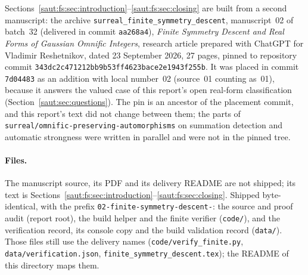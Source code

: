 \documentclass[11pt]{article}
\theoremstyle{definition}
\theoremstyle{remark}
\newcommand{\repo}[1]{\nolinkurl{#1}}%
\numberwithin{equation}{section}
\begin{document}
Sections~\ref{saut:fs:sec:introduction}--\ref{saut:fs:sec:closing} are built from a
second manuscript: the archive \texttt{surreal\_finite\_symmetry\_descent},
manuscript~02 of batch~32 (delivered in commit \texttt{aa268a4}), \emph{Finite
Symmetry Descent and Real Forms of Gaussian Omnific Integers}, research article
prepared with ChatGPT for Vladimir Reshetnikov, dated 23 September 2026, 27 pages,
pinned to repository commit
\texttt{343dc2c471212bb9b53ff4623bace2e1943f255b}. It was placed in commit
\texttt{7d04483} as an addition with local number~02 (source~01 counting as~01),
because it answers the valued case of this report's open real-form
classification (Section~\ref{saut:sec:questions}). The pin is an ancestor of the
placement commit, and this report's text did not change between them; the parts of
\repo{surreal/omnific-preserving-automorphisms} on summation detection and automatic
strongness were written in parallel and were not in the pinned tree.

\paragraph{Files.} The manuscript source, its PDF and its delivery README are not
shipped; its text is Sections~\ref{saut:fs:sec:introduction}--\ref{saut:fs:sec:closing}.
Shipped byte-identical, with the prefix \texttt{02-finite-symmetry-descent-}: the
source and proof audit (report root), the build helper and the finite verifier
(\texttt{code/}), and the verification record, its console copy and the build
validation record (\texttt{data/}). Those files still use the delivery names
(\texttt{code/verify\_finite.py}, \texttt{data/verification.json},
\texttt{finite\_symmetry\_descent.tex}); the README of this directory maps them.
\end{document}
